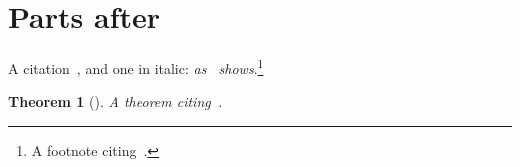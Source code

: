 \documentclass{article}
\newtheorem{theorem}{Theorem}
\begin{document}
\section{Parts after~\cite{baker}}
A citation~\cite{able}, and one in italic: \emph{as~\cite{baker} shows}.\footnote{A footnote citing~\cite{able}.}
\begin{theorem}[\cite{baker}]
A theorem citing~\cite{able}.
\end{theorem}

\end{document}
